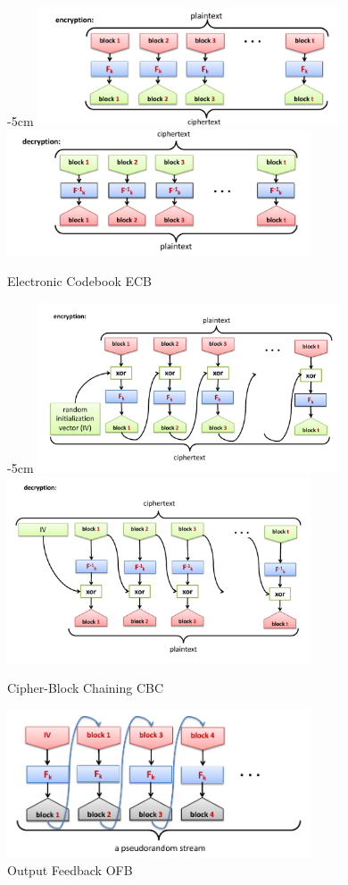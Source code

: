 \begin{figure}[h!]
    \centering
    \addtolength{\leftskip} {-5cm}
    \addtolength{\rightskip}{-5cm}
    \includegraphics[width=9cm]{images/ch2-bc-ecb-enc.png}
    \includegraphics[width=9cm]{images/ch2-bc-ecb-dec.png}
    \caption{Electronic Codebook ECB}
    \label{fig:bc-ecb}
\end{figure}
\begin{figure}[h!]
    \centering
    \addtolength{\leftskip} {-5cm}
    \addtolength{\rightskip}{-5cm}
    \includegraphics[width=9cm]{images/ch2-bc-cbc-enc.png}
    \includegraphics[width=9cm]{images/ch2-bc-cbc-dec.png}
    \caption{Cipher-Block Chaining CBC}
    \label{fig:bc-cbc-enc}
\end{figure}
\begin{figure}[h!]
    \centering
    \includegraphics[width=9cm]{images/ch2-bc-ofb.png}
    \caption{Output Feedback OFB}
    \label{fig:bc-ofb}
\end{figure}
